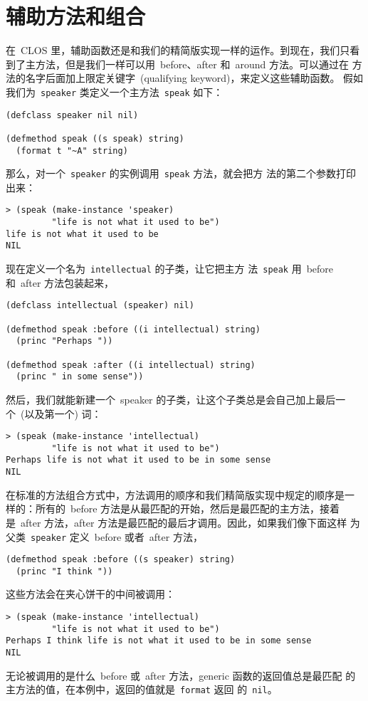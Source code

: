 \section{辅助方法和组合}
\label{sec:auxiliary_methods_and_combination}

在~CLOS 里，辅助函数还是和我们的精简版实现一样的运作。到现在，我们只看
到了主方法，但是我们一样可以用~before、after 和~around 方法。可以通过在
方法的名字后面加上限定关键字~(qualifying keyword)，来定义这些辅助函数。
假如我们为~\texttt{speaker} 类定义一个主方法~\texttt{speak} 如下：
\begin{lstlisting}
(defclass speaker nil nil)

(defmethod speak ((s speak) string)
  (format t "~A" string)
\end{lstlisting}
那么，对一个~\texttt{speaker} 的实例调用~\texttt{speak} 方法，就会把方
法的第二个参数打印出来：
\begin{lstlisting}
> (speak (make-instance 'speaker)
         "life is not what it used to be")
life is not what it used to be
NIL
\end{lstlisting}
现在定义一个名为~\texttt{intellectual} 的子类，让它把主方
法~\texttt{speak} 用~before 和~after 方法包装起来，
\begin{lstlisting}
(defclass intellectual (speaker) nil)

(defmethod speak :before ((i intellectual) string)
  (princ "Perhaps "))

(defmethod speak :after ((i intellectual) string)
  (princ " in some sense"))
\end{lstlisting}
然后，我们就能新建一个~speaker 的子类，让这个子类总是会自己加上最后一
个~(以及第一个) 词：
\begin{lstlisting}
> (speak (make-instance 'intellectual)
         "life is not what it used to be")
Perhaps life is not what it used to be in some sense
NIL
\end{lstlisting}
在标准的方法组合方式中，方法调用的顺序和我们精简版实现中规定的顺序是一
样的：所有的~before 方法是从最匹配的开始，然后是最匹配的主方法，接着
是~after 方法，after 方法是最匹配的最后才调用。因此，如果我们像下面这样
为父类~\texttt{speaker} 定义~before 或者~after 方法，
\begin{lstlisting}
(defmethod speak :before ((s speaker) string)
  (princ "I think "))
\end{lstlisting}
这些方法会在夹心饼干的中间被调用：
\begin{lstlisting}
> (speak (make-instance 'intellectual)
         "life is not what it used to be")
Perhaps I think life is not what it used to be in some sense
NIL
\end{lstlisting}
无论被调用的是什么~before 或~after 方法，generic 函数的返回值总是最匹配
的主方法的值，在本例中，返回的值就是~\texttt{format} 返回
的~\texttt{nil}。

